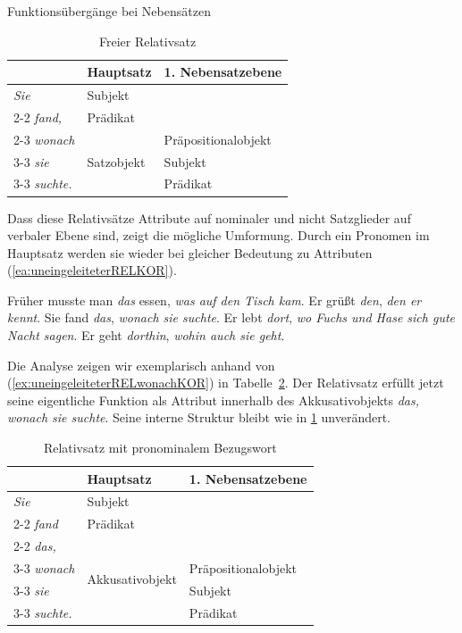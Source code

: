 \begin{Exkurs}{Funktionsübergänge bei Nebensätzen}
\begin{table}
  \centering
  \begin{tabular}{l|l|l}
     &  Hauptsatz  & 1. Nebensatzebene \\
    \hline
    \textit{Sie} & Subjekt &  \\ \cline{2-2}
    \textit{fand,} & Prädikat & \\ \cline{2-3}
    \textit{wonach} & \multirow{3}{*}{Satzobjekt} & Präpositionalobjekt \\ \cline{3-3}
    \textit{sie} &  & Subjekt  \\ \cline{3-3}   
    \textit{suchte.} & & Prädikat \\ 
    \hline 
  \end{tabular}
  \caption{Freier Relativsatz}
  \label{tab:freierRelativsatz}
\end{table}

Dass diese Relativsätze  Attribute auf nominaler und nicht Satzglieder auf verbaler Ebene sind, zeigt die mögliche Umformung. Durch ein Pronomen im Hauptsatz werden sie wieder bei gleicher Bedeutung zu Attributen (\ref{ea:uneingeleiteterRELKOR}).

\ea \label{ea:uneingeleiteterRELKOR}
\ea \label{ea:uneingeleiteterRELwasKOR} Früher musste man \textit{das} essen, \textit{was auf den Tisch kam}.
\ex \label{ex:uneingeleiteterRELwerKOR} Er grüßt \textit{den}, \textit{den er kennt}.
\ex \label{ex:uneingeleiteterRELwonachKOR} Sie fand \textit{das}, \textit{wonach sie suchte}.
\ex \label{ex:uneingeleiteterRELwoKOR} Er lebt \textit{dort}, \textit{wo Fuchs und Hase sich gute Nacht sagen}.
\ex \label{ex:uneingeleiteterRELwohinKOR} Er geht \textit{dorthin}, \textit{wohin auch sie geht}.
\z 
\z 

Die Analyse zeigen wir exemplarisch anhand von (\ref{ex:uneingeleiteterRELwonachKOR}) in Tabelle~\ref{tab:Relativsatz_mit_pronominalem_Bezugswort}. Der Relativsatz erfüllt jetzt seine eigentliche Funktion als Attribut innerhalb des Akkusativobjekts \textit{das, wonach sie suchte}. Seine interne Struktur bleibt wie in \ref{tab:freierRelativsatz} unverändert.

\begin{table}
  \centering
  \begin{tabular}{l|l|l}
     & Hauptsatz &  1. Nebensatzebene \\
    \hline
    \textit{Sie} & Subjekt &  \\ \cline{2-2}
    \textit{fand} & Prädikat & \\ \cline{2-2}
    \textit{das,} & \multirow{4}{*}{Akkusativobjekt} & \\ \cline{3-3}
    \textit{wonach} & & Präpositionalobjekt \\ \cline{3-3}
    \textit{sie} &  & Subjekt  \\ \cline{3-3}   
    \textit{suchte.} & & Prädikat \\  
    \hline
  \end{tabular}
  \caption{Relativsatz mit pronominalem Bezugswort}
  \label{tab:Relativsatz_mit_pronominalem_Bezugswort}
\end{table}


\end{Exkurs}
